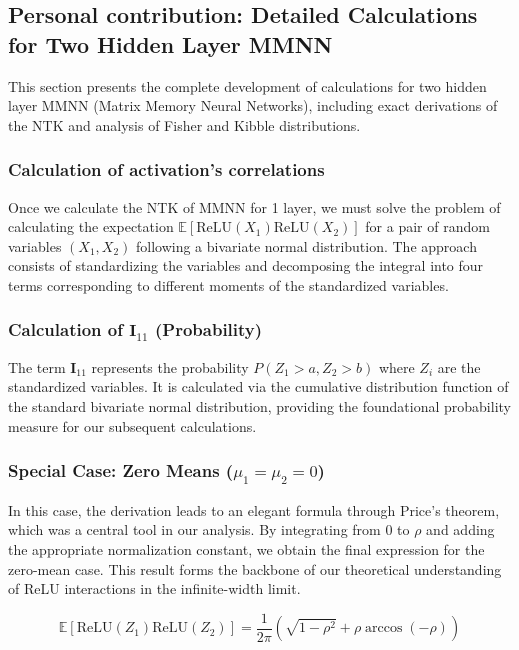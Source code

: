 \documentclass[a4paper]{article}
\newcommand{\E}{\mathbb{E}}
\newcommand{\E}{\mathbb{E}}
\theoremstyle{plain}
\theoremstyle{definition}
\theoremstyle{remark}
\begin{document}
\newpage
\subsection{Personal contribution: Detailed Calculations for Two Hidden Layer MMNN}
\label{app:mmnn}

This section presents the complete development of calculations for two hidden layer MMNN (Matrix Memory Neural Networks), including exact derivations of the NTK and analysis of Fisher and Kibble distributions.

\subsubsection{Calculation of activation's correlations}

Once we calculate the NTK of MMNN for 1 layer, we must solve the problem of calculating the expectation $\E[\text{ReLU}(X_1)\text{ReLU}(X_2)]$ for a pair of random variables $(X_1, X_2)$ following a bivariate normal distribution. The approach consists of standardizing the variables and decomposing the integral into four terms corresponding to different moments of the standardized variables.

\subsubsection{Calculation of $\mathbf{I}_{11}$ (Probability)}

The term $\mathbf{I}_{11}$ represents the probability $P(Z_1 > a, Z_2 > b)$ where $Z_i$ are the standardized variables. It is calculated via the cumulative distribution function of the standard bivariate normal distribution, providing the foundational probability measure for our subsequent calculations.

\subsubsection{Special Case: Zero Means ($\mu_1=\mu_2=0$)}

In this case, the derivation leads to an elegant formula through Price's theorem, which was a central tool in our analysis. By integrating from $0$ to $\rho$ and adding the appropriate normalization constant, we obtain the final expression for the zero-mean case. This result forms the backbone of our theoretical understanding of ReLU interactions in the infinite-width limit.

\begin{equation}
\boxed{\E[\text{ReLU}(Z_1)\text{ReLU}(Z_2)] = \frac{1}{2\pi}(\sqrt{1-\rho^2} + \rho\arccos(-\rho))}
\end{equation}
\end{document}

